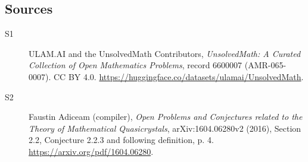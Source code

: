 \documentclass[11pt]{article}
\begin{document}
\subsection{Sources}
\begin{description}
\item[\hypertarget{source:6600007:1}{S1}] ULAM.AI and the UnsolvedMath Contributors, \emph{UnsolvedMath: A Curated Collection of Open Mathematics Problems}, record 6600007 (AMR-065-0007). CC BY 4.0. \url{https://huggingface.co/datasets/ulamai/UnsolvedMath}.
\item[\hypertarget{source:6600007:2}{S2}] Faustin Adiceam (compiler), \emph{Open Problems and Conjectures related to the Theory of Mathematical Quasicrystals}, arXiv:1604.06280v2 (2016), Section 2.2, Conjecture 2.2.3 and following definition, p. 4. \url{https://arxiv.org/pdf/1604.06280}.
\end{description}
\label{end:6600007}
\end{document}
